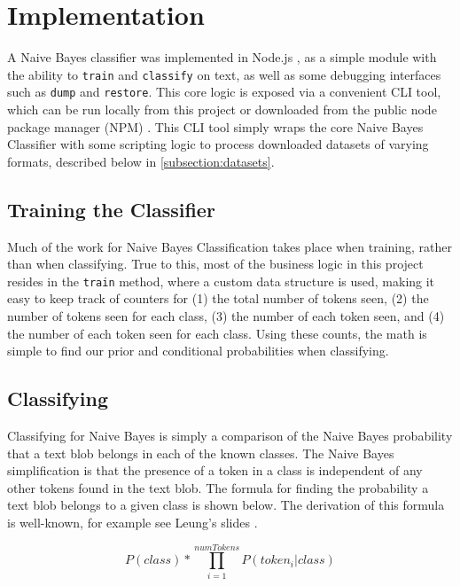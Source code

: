 \section{Implementation}
\label{section:implementation}
A Naive Bayes classifier was implemented in Node.js \cite{node}, as a simple module with the ability to \texttt{train}
and \texttt{classify} on text, as well as some debugging interfaces such as \texttt{dump} and \texttt{restore}. This
core logic is exposed via a convenient CLI tool, which can be run locally from this project or downloaded from the
public node package manager (NPM) \cite{rdn-naive-bayes}. This CLI tool simply wraps the core Naive Bayes Classifier
with some scripting logic to process downloaded datasets of varying formats,
described below in \ref{subsection:datasets}.

\subsection{Training the Classifier}
\label{subsection:training}
Much of the work for Naive Bayes Classification takes place when training, rather than when classifying. True to this,
most of the business logic in this project resides in the \texttt{train} method, where a custom data structure is used,
making it easy to keep track of counters for (1) the total number of tokens seen, (2) the number of tokens seen for each
class, (3) the number of each token seen, and (4) the number of each token seen for each class. Using these counts,
the math is simple to find our prior and conditional probabilities when classifying.

\subsection{Classifying}
\label{subsection:classifying}
Classifying for Naive Bayes is simply a comparison of the Naive Bayes probability that a text blob belongs in each of
the known classes. The Naive Bayes simplification is that the presence of a token in a class is independent of any
other tokens found in the text blob. The formula for finding the probability a text blob belongs to a given class is
shown below. The derivation of this formula is well-known, for example see Leung's slides \cite{naive-bayes-slides}.

\begin{equation}
P(class)*\prod_{i=1}^{numTokens} P(token_i | class)
\end{equation}

